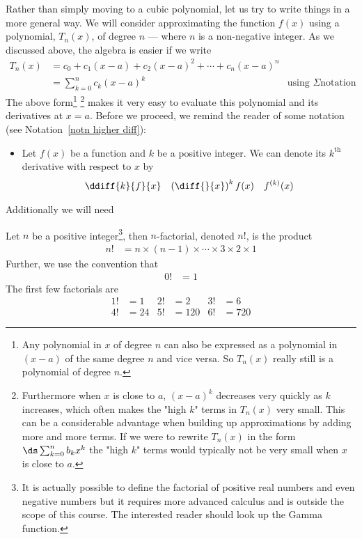 Rather than simply moving to a cubic polynomial, let us try to write things in a more
general way. We will consider approximating the function $f(x)$ using a polynomial,
$T_n(x)$, of degree $n$ --- where $n$ is a non-negative integer. As we discussed
above, the algebra is easier if we write
\begin{align*}
  T_n(x) &= c_0 + c_1(x-a) + c_2 (x-a)^2 + \cdots + c_n (x-a)^n\\
  &= \sum_{k=0}^n c_k (x-a)^k & \text{using $\Sigma$
notation}
\end{align*}
The above form\footnote{Any polynomial in $x$ of degree $n$ can also be
expressed as a polynomial in $(x-a)$ of the same degree $n$ and vice versa.  So
$T_n(x)$ really still is a polynomial of degree $n$.} \footnote{Furthermore
when $x$ is close to $a$, $(x-a)^k$ decreases very quickly as $k$ increases,
which often makes the "high $k$" terms in $T_n(x)$ very small. This can be a
considerable advantage when building up approximations by adding more and more
terms.  If we were to rewrite  $T_n(x)$ in the form $\ds \sum_{k=0}^n b_k x^k$
the "high $k$" terms would typically not be very small when $x$ is close to
$a$. } makes it very easy to evaluate this polynomial and its derivatives at
$x=a$. Before we proceed, we remind the reader of some notation (see
Notation~\ref{notn higher diff}):
\begin{itemize}
 \item Let $f(x)$ be a function and $k$ be a positive integer. We can denote
its $k^\mathrm{th}$ derivative with respect to $x$ by
\begin{align*}
  \ddiff{k}{f}{x} && \left( \diff{}{x}\right)^k f(x) && f^{(k)}(x)
\end{align*}
\end{itemize}

Additionally we will need
\begin{defn}[Factorial]\label{def_3_4_1}
  Let $n$ be a positive integer\footnote{It is actually possible to define the
factorial of positive real numbers and even negative numbers but it requires more
advanced calculus and is outside the scope of this course. The interested reader should
look up the Gamma function.}, then $n$-factorial, denoted $n!$, is the product
  \begin{align*}
    n! &= n \times (n-1) \times \cdots \times 3 \times 2 \times 1
  \end{align*}
  Further, we use the convention that
  \begin{align*}
  0! &= 1
  \end{align*}
  The first few factorials are
\begin{align*}
  1! &=1 &
  2! &=2 &
  3! &=6 \\
  4! &=24 &
  5! &=120 &
  6! &=720
\end{align*}
\end{defn}

